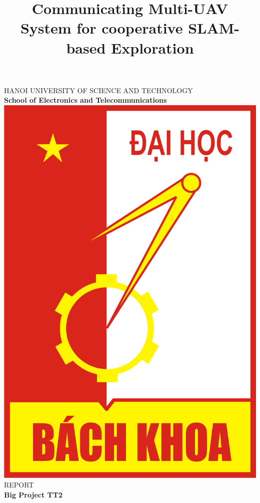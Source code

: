 \documentclass[11pt,openany]{book}
\title{Communicating Multi-UAV System for cooperative SLAM-based Exploration}
\begin{document}
\begin{titlepage}
    \begin{center}
        \small
        HANOI UNIVERSITY OF SCIENCE AND TECHNOLOGY\\
        \vspace{0.2cm}
        \LARGE
        \textbf{School of Electronics and Telecommunications}\\
        \vspace{1.5cm}
        \includegraphics[scale=0.3]{assets/logo.png}\\
        \vspace{1.5cm}
        \LARGE
        REPORT\\
        \vspace{0.5cm}
        \Huge
        \textbf{Big Project TT2}
        \vspace{2cm}

\end{center}
\end{titlepage}
\end{document}
